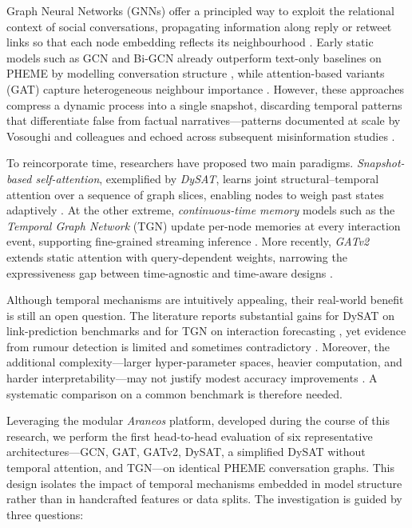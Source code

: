 \documentclass{cshonours}
\begin{document}
Graph Neural Networks (GNNs) offer a principled way to exploit the relational context of social conversations, propagating information along reply or retweet links so that each node embedding reflects its neighbourhood \cite{kipf2017semi}.  Early static models such as GCN and Bi-GCN already outperform text-only baselines on PHEME by modelling conversation structure \cite{bian2020rumor}, while attention-based variants (GAT) capture heterogeneous neighbour importance \cite{lv2022rumor}.  However, these approaches compress a dynamic process into a single snapshot, discarding temporal patterns that differentiate false from factual narratives—patterns documented at scale by Vosoughi and colleagues \cite{vosoughi2018spread} and echoed across subsequent misinformation studies \cite{survey2024disinfo}.


To reincorporate time, researchers have proposed two main paradigms.  \emph{Snapshot-based self-attention}, exemplified by \emph{DySAT}, learns joint structural–temporal attention over a sequence of graph slices, enabling nodes to weigh past states adaptively \cite{sankar2020dysat}.  At the other extreme, \emph{continuous-time memory} models such as the \emph{Temporal Graph Network} (TGN) update per-node memories at every interaction event, supporting fine-grained streaming inference \cite{rossi2020tgn}.  More recently, \emph{GATv2} extends static attention with query-dependent weights, narrowing the expressiveness gap between time-agnostic and time-aware designs \cite{brody2022gatv2}.


Although temporal mechanisms are intuitively appealing, their real-world benefit is still an open question.  The literature reports substantial gains for DySAT on link-prediction benchmarks \cite{sankar2020dysat} and for TGN on interaction forecasting \cite{rossi2020tgn}, yet evidence from rumour detection is limited and sometimes contradictory \cite{liu2025rumor}.  Moreover, the additional complexity—larger hyper-parameter spaces, heavier computation, and harder interpretability—may not justify modest accuracy improvements \cite{survey2024disinfo}.  A systematic comparison on a common benchmark is therefore needed.


Leveraging the modular \emph{Araneos} platform, developed during the course of this research, we perform the first head-to-head evaluation of six representative architectures—GCN, GAT, GATv2, DySAT, a simplified DySAT without temporal attention, and TGN—on identical PHEME conversation graphs.  This design isolates the impact of temporal mechanisms embedded in model structure rather than in handcrafted features or data splits.  The investigation is guided by three questions:
\end{document}
